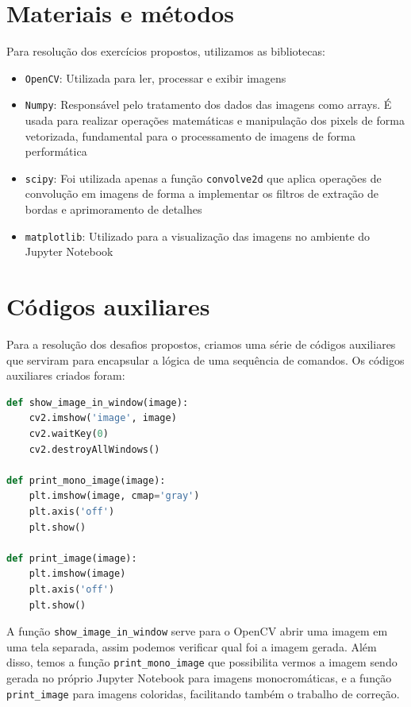 \documentclass[12pt,a4paper]{report}
\begin{document}
\section{Materiais e métodos}
Para resolução dos exercícios propostos, utilizamos as bibliotecas:
\begin{itemize}
    \item \texttt{OpenCV}: Utilizada para ler, processar e exibir imagens
    \item \texttt{Numpy}: Responsável pelo tratamento dos dados das imagens como arrays. É usada para realizar operações matemáticas e manipulação dos pixels de forma vetorizada, fundamental para o processamento de imagens de forma performática
    \item \texttt{scipy}: Foi utilizada apenas a função \texttt{convolve2d} que aplica operações de convolução em imagens de forma a implementar os filtros de extração de bordas e aprimoramento de detalhes
    \item \texttt{matplotlib}: Utilizado para a visualização das imagens no ambiente do Jupyter Notebook
    
\end{itemize}
\section{Códigos auxiliares}
Para a resolução dos desafios propostos, criamos uma série de códigos auxiliares que serviram para encapsular a lógica de uma sequência de comandos. Os códigos auxiliares criados foram:

\begin{lstlisting}[language=Python, caption={Funções auxiliares para visualização de imagens}]
def show_image_in_window(image):
    cv2.imshow('image', image)
    cv2.waitKey(0)
    cv2.destroyAllWindows()

def print_mono_image(image):
    plt.imshow(image, cmap='gray')
    plt.axis('off')
    plt.show()
    
def print_image(image):
    plt.imshow(image)
    plt.axis('off')
    plt.show()
\end{lstlisting}

A função \texttt{show\_image\_in\_window} serve para o OpenCV abrir uma imagem em uma tela separada, assim podemos verificar qual foi a imagem gerada. Além disso, temos a função \texttt{print\_mono\_image} que possibilita vermos a imagem sendo gerada no próprio Jupyter Notebook para imagens monocromáticas, e a função \texttt{print\_image} para imagens coloridas, facilitando também o trabalho de correção.
\end{document}
